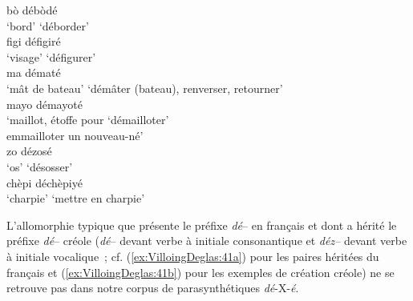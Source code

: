 \documentclass[output=paper]{langsci/langscibook}
\begin{document}
\ea \label{ex:VilloingDeglas:40}
      \ea\label{ex:VilloingDeglas:40a}
            \ea \gll  bò \textrightarrow{~} débòdé\\
              {`bord'} {} {`déborder'}\\
            \ex \gll  figi \textrightarrow{~} défigiré\\
              {`visage'} {} {`défigurer'}\\
            \ex \gll  ma \textrightarrow{~} dématé\\
              {`mât de bateau'} {} {`démâter (bateau), renverser, retourner'}\\
            \ex \glll  mayo  \textrightarrow{~} démayoté\\
             {`maillot, étoffe pour} {} `démailloter'\\
             {emmailloter un nouveau-né'} {} {} \\
            \ex \gll  zo \textrightarrow{~} dézosé\\
              {`os'} {} {`désosser'}\\
            \z
      \ex\label{ex:VilloingDeglas:40b} \gll  chèpi \textrightarrow{~} déchèpiyé\\
        {`charpie'} {} {`mettre en charpie'}\\
      \z
\z


L'allomorphie typique que présente le préfixe \emph{dé}-- en français et
dont a hérité le préfixe \emph{dé}-- créole (\emph{dé}-- devant verbe à
initiale consonantique et \emph{déz--} devant verbe à initiale
vocalique~; cf. (\ref{ex:VilloingDeglas:41a}) pour les paires héritées du français et (\ref{ex:VilloingDeglas:41b}) pour
les exemples de création créole) ne se retrouve pas dans notre corpus de
parasynthétiques \emph{dé}-X-\emph{é}.
\end{document}
